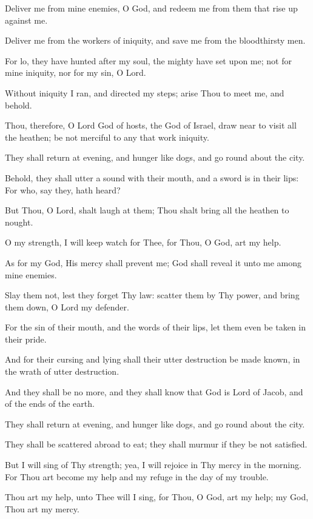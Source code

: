 Deliver me from mine enemies, O God, and redeem me from them that rise up against me.

Deliver me from the workers of iniquity, and save me from the bloodthirsty men.

For lo, they have hunted after my soul, the mighty have set upon me; not for mine iniquity, nor for my sin, O Lord.

Without iniquity I ran, and directed my steps; arise Thou to meet me, and behold.

Thou, therefore, O Lord God of hosts, the God of Israel, draw near to visit all the heathen; be not merciful to any that work iniquity.

They shall return at evening, and hunger like dogs, and go round about the city.

Behold, they shall utter a sound with their mouth, and a sword is in their lips: For who, say they, hath heard?

But Thou, O Lord, shalt laugh at them; Thou shalt bring all the heathen to nought.

O my strength, I will keep watch for Thee, for Thou, O God, art my help.

As for my God, His mercy shall prevent me; God shall reveal it unto me among mine enemies.

Slay them not, lest they forget Thy law: scatter them by Thy power, and bring them down, O Lord my defender.

For the sin of their mouth, and the words of their lips, let them even be taken in their pride.

And for their cursing and lying shall their utter destruction be made known, in the wrath of utter destruction.

And they shall be no more, and they shall know that God is Lord of Jacob, and of the ends of the earth.

They shall return at evening, and hunger like dogs, and go round about the city.

They shall be scattered abroad to eat; they shall murmur if they be not satisfied.

But I will sing of Thy strength; yea, I will rejoice in Thy mercy in the morning. For Thou art become my help and my refuge in the day of my trouble.

Thou art my help, unto Thee will I sing, for Thou, O God, art my help; my God, Thou art my mercy.
